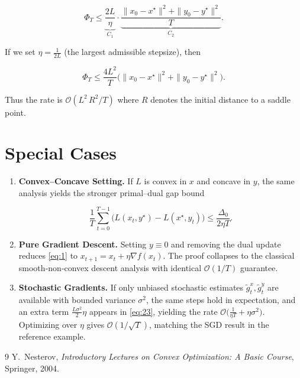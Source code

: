 \documentclass{article}
\begin{document}
\[
\Phi_T
\le \underbrace{\frac{2L}{\eta}}_{C_1}
\cdot\underbrace{\frac{\|x_{0}-x^{\star}\|^{2}+\|y_{0}-y^{\star}\|^{2}}{T}}_{C_2}.
\]

If we set \(\eta = \frac{1}{2L}\) (the largest admissible stepsize), then  

\[
\Phi_T \le \frac{4L^{2}}{T}\big(\|x_{0}-x^{\star}\|^{2}+\|y_{0}-y^{\star}\|^{2}\big).
\tag{24}
\]

Thus the rate is \(\mathcal{O}(L^{2}\,R^{2}/T)\) where \(R\) denotes the initial distance to a saddle point.

\section*{Special Cases}
\begin{enumerate}[label=\alph*.]
\item \textbf{Convex–Concave Setting.} If \(L\) is convex in \(x\) and concave in \(y\), the same analysis yields the stronger primal–dual gap bound  

\[
\frac{1}{T}\sum_{t=0}^{T-1}\big(L(x_t,y^{\star})-L(x^{\star},y_t)\big)
\le \frac{\Delta_{0}}{2\eta T}.
\]

\item \textbf{Pure Gradient Descent.} Setting \(y\equiv 0\) and removing the dual update reduces \eqref{eq:1} to \(x_{t+1}=x_t+\eta\nabla f(x_t)\). The proof collapses to the classical smooth‑non‑convex descent analysis with identical \(\mathcal{O}(1/T)\) guarantee.

\item \textbf{Stochastic Gradients.} If only unbiased stochastic estimates \(\tilde g_t^{x},\tilde g_t^{y}\) are available with bounded variance \(\sigma^{2}\), the same steps hold in expectation, and an extra term \(\frac{L\sigma^{2}}{2}\eta\) appears in \eqref{eq:23}, yielding the rate \(\mathcal{O}\big(\frac{1}{\eta T}+\eta\sigma^{2}\big)\). Optimizing over \(\eta\) gives \(\mathcal{O}(1/\sqrt{T})\), matching the SGD result in the reference example.
\end{enumerate}

\begin{thebibliography}{9}
Y.~Nesterov,
\textit{Introductory Lectures on Convex Optimization: A Basic Course},
Springer, 2004.
\end{thebibliography}
\end{document}
